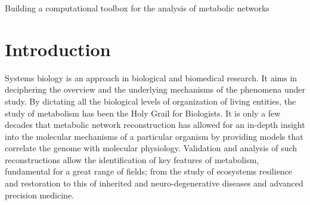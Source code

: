 \documentclass[a4paper, 12pt]{article}
\begin{document}
\begin{center}
    \Large{Building a computational toolbox for the analysis of metabolic networks}
\end{center}



\section{Introduction}

Systems biology is an approach in biological and biomedical research. It aims in deciphering the overview and the underlying mechanisms of the phenomena under study. By dictating all the biological levels of organization of living entities, the study of metabolism has been the Holy Grail for Biologists. It is only a few decades that metabolic network reconstruction has allowed for an in-depth insight into the molecular mechanisms of a particular organism by providing models that correlate the genome with molecular physiology. Validation and analysis of such reconstructions allow the identification of key features of metabolism, fundamental for a great range of fields; from the study of ecosystems resilience and restoration to this of inherited and neuro-degenerative diseases and advanced precision medicine. 
\end{document}
